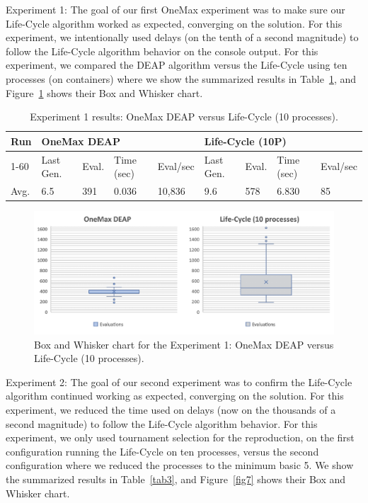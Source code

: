 \documentclass[runningheads]{llncs}
\begin{document}
Experiment 1: The goal of our first OneMax experiment was to make sure our
Life-Cycle algorithm worked as expected, converging on the solution. For this
experiment, we intentionally used delays (on the tenth of a second magnitude)
to follow the Life-Cycle algorithm behavior on the console output. For this
experiment, we compared the DEAP algorithm versus the Life-Cycle using ten
processes (on containers) where we show the summarized results in Table~\ref{tab2}, and
Figure~\ref{fig6} shows their Box and Whisker chart.

\begin{table}[]
    \centering        
    \caption{Experiment 1 results: OneMax DEAP versus Life-Cycle (10 processes).}\label{tab2}
    \begin{tabular}{|l|l|l|l|l|l|l|l|l|}
    \hline
    Run & \multicolumn{4}{l|}{OneMax DEAP} & \multicolumn{4}{l|}{Life-Cycle (10P)} \\ \hline
    1-60 & Last Gen. & Eval. & Time (sec) & Eval/sec & Last Gen. & Eval. & Time (sec) & Eval/sec \\ \hline
    Avg. & 6.5 & 391 & 0.036 & 10,836 & 9.6 & 578 & 6.830 & 85 \\ \hline
    \end{tabular}
    \end{table}

\begin{figure}
    \includegraphics[width=\textwidth]{img/fig6_experiment01_chart.pdf}
    \caption{Box and Whisker chart for the Experiment 1: OneMax DEAP versus Life-Cycle (10 processes).} \label{fig6}
    \end{figure}


Experiment 2: The goal of our second experiment was to confirm the Life-Cycle
algorithm continued working as expected, converging on the solution. For this
experiment, we reduced the time used on delays (now on the thousands of a
second magnitude) to follow the Life-Cycle algorithm behavior. For this
experiment, we only used tournament selection for the reproduction, on the
first configuration running the Life-Cycle on ten processes, versus the second
configuration where we reduced the processes to the minimum basic 5. We show
the summarized results in Table~\ref{tab3}, and Figure~\ref{fig7} shows their Box and Whisker
chart.
\end{document}
